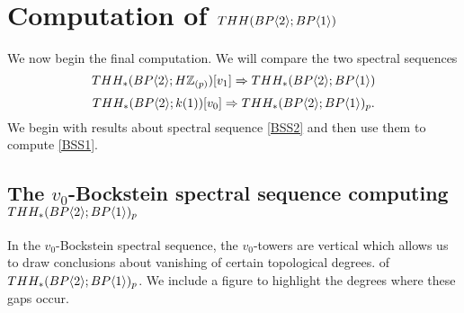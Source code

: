
\section{Computation of $THH(BP\langle 2 \rangle;BP\langle 1 \rangle)$}
We now begin the final computation. We will compare the two spectral sequences
\begin{equation}\label{BSS1} THH_*(BP\langle 2 \rangle;H\mathbb{Z}_{(p)})[v_1] \Rightarrow THH_*(BP\langle 2 \rangle;BP\langle 1 \rangle) \end{equation}
\begin{equation}\label{BSS2} THH_*(BP\langle 2 \rangle; k(1))[v_0]\Rightarrow THH_*(BP\langle 2 \rangle;BP\langle 1 \rangle)_p.\end{equation}
We begin with results about spectral sequence  \eqref{BSS2} and then use them to compute \eqref{BSS1}.

\subsection{The $v_0$-Bockstein spectral sequence computing $THH_*(BP\langle 2 \rangle;BP\langle 1 \rangle)_p$}
In the $v_0$-Bockstein spectral sequence, the $v_0$-towers are vertical which allows us to draw conclusions about vanishing of certain topological degrees. of $THH_*(BP\langle 2 \rangle;BP\langle 1 \rangle)_p$. We include a figure to highlight the degrees where these gaps occur. 


